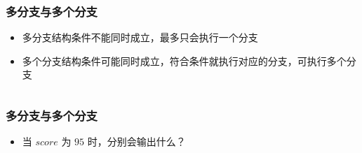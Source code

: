 \begin{frame}[fragile]
    \frametitle{多分支与多个分支}

    \begin{itemize}
        \item<1-> 多分支结构条件不能同时成立，最多只会执行一个分支
        \item<2-> 多个分支结构条件可能同时成立，符合条件就执行对应的分支，可执行多个分支
    \end{itemize}

    \begin{columns}



    \end{columns}
\end{frame}

\begin{frame}[fragile]
    \frametitle{多分支与多个分支}

    \begin{itemize}
        \item 当 $score$ 为 $95$ 时，分别会输出什么？
    \end{itemize}

    \begin{columns}

        


        
    \end{columns}
\end{frame}

